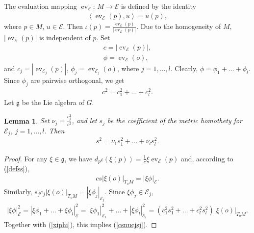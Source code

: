 \documentclass[10pt]{amsart}
\newtheorem{lemma}{Lemma}
\theoremstyle{remark}
\begin{document}
The evaluation mapping ${\mathop{\mathrm{ev}}\nolimits}_{\mathcal{E}}:\,M\to{\mathcal{E}}$ is defined by the
identity
\begin{eqnarray}\label{defev}
{\left<{{\mathop{\mathrm{ev}}\nolimits}_{\mathcal{E}}(p)},{u}\right>}=u(p),
\end{eqnarray}
where $p\in M$, $u\in{\mathcal{E}}$. Then
$\iota(p)=\frac{{\mathop{\mathrm{ev}}\nolimits}_{\mathcal{E}}(p)}{|{\mathop{\mathrm{ev}}\nolimits}_{\mathcal{E}}(p)|}$.
Due to the homogeneity of $M$, $|{\mathop{\mathrm{ev}}\nolimits}_{\mathcal{E}}(p)|$ is independent of
$p$. Set
\begin{eqnarray}
\label{defcevp}c=|{\mathop{\mathrm{ev}}\nolimits}_{\mathcal{E}}(p)|,\\
\phi={\mathop{\mathrm{ev}}\nolimits}_{\mathcal{E}}(o),\nonumber
\end{eqnarray}
and $c_j=|{\mathop{\mathrm{ev}}\nolimits}_{{\mathcal{E}}_j}(p)|$, $\phi_j={\mathop{\mathrm{ev}}\nolimits}_{{\mathcal{E}}_j}(o)$, where
$j=1,\dots,l$. Clearly, $\phi=\phi_1+\dots+\phi_l$. Since $\phi_j$
are pairwise orthogonal, we get
\begin{eqnarray}\label{cjcjsq}
c^2=c_1^2+\dots+c_l^2.
\end{eqnarray}
Let ${\mathord{\mathfrak{g}}}$ be the Lie algebra of $G$.
\begin{lemma}\label{snusj}
Set $\nu_j=\frac{c_j^2}{c^2}$, and let $s_j$ be the coefficient of
the metric homothety for ${\mathcal{E}}_j$, $j=1,\dots,l$. Then
\begin{eqnarray}\label{csnucjsj}
s^2=\nu_1s_1^2+\dots+\nu_ls_l^2.
\end{eqnarray}
\end{lemma}
\begin{proof}
For any $\xi\in{\mathord{\mathfrak{g}}}$, we have
$d_p\iota(\xi(p))=\frac{1}{c}\xi{\mathop{\mathrm{ev}}\nolimits}_{\mathcal{E}}(p)$ and, according to
(\ref{defss}),
\begin{eqnarray}\label{xiphi}
cs|\xi(o)|_{T_oM}=|\xi\phi|_{\mathcal{E}}.
\end{eqnarray}
Similarly, $s_jc_j|\xi(o)|_{T_oM}=|\xi\phi_j|_{{\mathcal{E}}_j}$. Since
$\xi\phi_j\in{\mathcal{E}}_j$,
\begin{eqnarray*}
|\xi\phi|_{\mathcal{E}}^2=|\xi\phi_1+\dots+\xi\phi_l|^2_{\mathcal{E}}
=|\xi\phi_1|_{{\mathcal{E}}_1}^2+\dots+|\xi\phi_l|_{{\mathcal{E}}_l}^2
=(c_1^2s_1^2+\dots+c_l^2s_l^2)|\xi(o)|_{T_oM}.
\end{eqnarray*}
Together with (\ref{xiphi}), this implies (\ref{csnucjsj}).
\end{proof}
\end{document}
